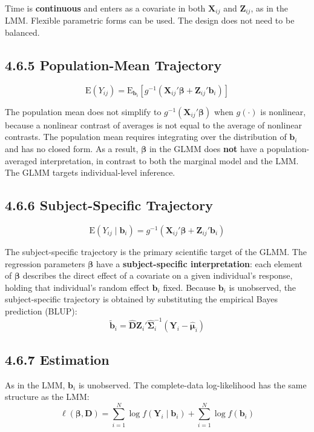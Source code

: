 \documentclass[11pt]{article}
\newcommand{\bY}{\mathbf{Y}}
\newcommand{\bZ}{\mathbf{Z}}
\newcommand{\bbeta}{\boldsymbol{\beta}}
\newcommand{\bSigma}{\boldsymbol{\Sigma}}
\newcommand{\bmu}{\boldsymbol{\mu}}
\newcommand{\E}{\mathrm{E}}
\begin{document}
Time is \textbf{continuous} and enters as a covariate in both $\mathbf{X}_{ij}$ and $\mathbf{Z}_{ij}$, as in the LMM. Flexible parametric forms can be used. The design does not need to be balanced.

\subsection*{4.6.5 Population-Mean Trajectory}

$$\E(Y_{ij}) = \E_{\mathbf{b}_i}\left[g^{-1}(\mathbf{X}_{ij}'\bbeta + \mathbf{Z}_{ij}'\mathbf{b}_i)\right]$$

The population mean does not simplify to $g^{-1}(\mathbf{X}_{ij}'\bbeta)$ when $g(\cdot)$ is nonlinear, because a nonlinear contrast of averages is not equal to the average of nonlinear contrasts. The population mean requires integrating over the distribution of $\mathbf{b}_i$ and has no closed form. As a result, $\bbeta$ in the GLMM does \textbf{not} have a population-averaged interpretation, in contrast to both the marginal model and the LMM. The GLMM targets individual-level inference.

\subsection*{4.6.6 Subject-Specific Trajectory}

$$\E(Y_{ij} \mid \mathbf{b}_i) = g^{-1}(\mathbf{X}_{ij}'\bbeta + \mathbf{Z}_{ij}'\mathbf{b}_i)$$

The subject-specific trajectory is the primary scientific target of the GLMM. The regression parameters $\bbeta$ have a \textbf{subject-specific interpretation}: each element of $\bbeta$ describes the direct effect of a covariate on a given individual's response, holding that individual's random effect $\mathbf{b}_i$ fixed. Because $\mathbf{b}_i$ is unobserved, the subject-specific trajectory is obtained by substituting the empirical Bayes prediction (BLUP):
$$\tilde{\mathbf{b}}_i = \hat{\mathbf{D}}\bZ_i'\hat{\bSigma}_i^{-1}(\bY_i - \hat{\bmu}_i)$$

\subsection*{4.6.7 Estimation}

As in the LMM, $\mathbf{b}_i$ is unobserved. The complete-data log-likelihood has the same structure as the LMM:
$$\ell(\bbeta, \mathbf{D}) = \sum_{i=1}^N \log f(\bY_i \mid \mathbf{b}_i) + \sum_{i=1}^N \log f(\mathbf{b}_i)$$
\end{document}
